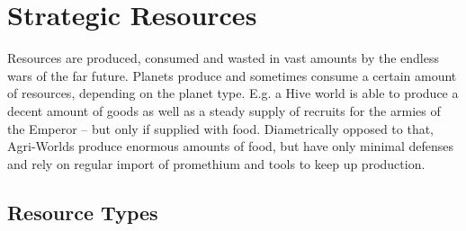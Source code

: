 \section{Strategic Resources} 

 Resources are produced, consumed and wasted in vast amounts by the endless wars of the far future. Planets produce and sometimes consume a certain amount of resources, depending on the planet type. E.g. a Hive world is able to produce a decent amount of goods as well as a steady supply of recruits for the armies of the Emperor – but only if supplied with food. Diametrically opposed to that, Agri-Worlds produce enormous amounts of food, but have only minimal defenses and rely on regular import of promethium and tools to keep up production. \\
\subsection{Resource Types} 

